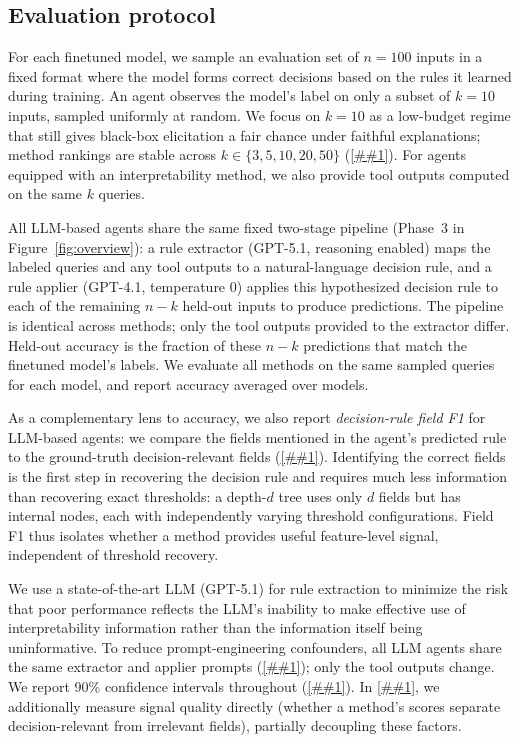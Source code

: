 \documentclass{article} %
\newcommand{\Cref}[1]{\ref{##1}}
\begin{document}
\subsection{Evaluation protocol}
\label{sec:eval}

For each finetuned model, we sample an evaluation set of $n{=}100$ inputs in a fixed format where the model forms correct decisions based on the rules it learned during training.
An agent observes the model's label on only a subset of $k{=}10$ inputs, sampled uniformly at random.
We focus on $k{=}10$ as a low-budget regime that still gives black-box elicitation a fair chance under faithful explanations; method rankings are stable across $k \in \{3, 5, 10, 20, 50\}$ (\Cref{fig:budget}).
For agents equipped with an interpretability method, we also provide tool outputs computed on the same $k$ queries.

All LLM-based agents share the same fixed two-stage pipeline (Phase~3 in Figure~\ref{fig:overview}): a rule extractor (GPT-5.1, reasoning enabled) maps the labeled queries and any tool outputs to a natural-language decision rule, and a rule applier (GPT-4.1, temperature 0) applies this hypothesized decision rule to each of the remaining $n{-}k$ held-out inputs to produce predictions. The pipeline is identical across methods; only the tool outputs provided to the extractor differ.
Held-out accuracy is the fraction of these $n{-}k$ predictions that match the finetuned model's labels.
We evaluate all methods on the same sampled queries for each model, and report accuracy averaged over models.

As a complementary lens to accuracy, we also report \emph{decision-rule field F1} for LLM-based agents: we compare the fields mentioned in the agent's predicted rule to the ground-truth decision-relevant fields (\Cref{app:field_f1}).
Identifying the correct fields is the first step in recovering the decision rule and requires much less information than recovering exact thresholds: a depth-$d$ tree uses only $d$ fields but has  internal nodes, each with independently varying threshold configurations.
Field F1 thus isolates whether a method provides useful feature-level signal, independent of threshold recovery.


We use a state-of-the-art LLM (GPT-5.1) for rule extraction to minimize the risk that poor performance reflects the LLM's inability to make effective use of interpretability information rather than the information itself being uninformative. To reduce prompt-engineering confounders, all LLM agents share the same extractor and applier prompts (\Cref{app:prompts}); only the tool outputs change. We report 90\% confidence intervals throughout (\Cref{app:stats}).
In \Cref{sec:mechanistic}, we additionally measure signal quality directly (whether a method's scores separate decision-relevant from irrelevant fields), partially decoupling these factors.
\end{document}
